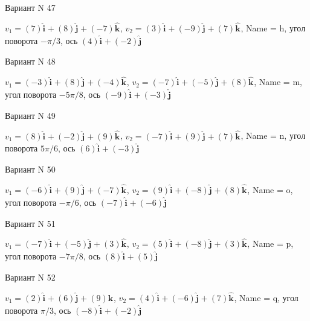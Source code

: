 \documentclass[11pt]{report}
\begin{document}
Вариант N 47

$v_1 = \left(7\right)\mathbf{\hat{i}_{}} + \left(8\right)\mathbf{\hat{j}_{}} + \left(-7\right)\mathbf{\hat{k}_{}}$, $v_2 = \left(3\right)\mathbf{\hat{i}_{}} + \left(-9\right)\mathbf{\hat{j}_{}} + \left(7\right)\mathbf{\hat{k}_{}}$, Name = h, угол поворота $- \pi / 3$, ось $\left(4\right)\mathbf{\hat{i}_{}} + \left(-2\right)\mathbf{\hat{j}_{}}$

Вариант N 48

$v_1 = \left(-3\right)\mathbf{\hat{i}_{}} + \left(8\right)\mathbf{\hat{j}_{}} + \left(-4\right)\mathbf{\hat{k}_{}}$, $v_2 = \left(-7\right)\mathbf{\hat{i}_{}} + \left(-5\right)\mathbf{\hat{j}_{}} + \left(8\right)\mathbf{\hat{k}_{}}$, Name = m, угол поворота $- 5 \pi / 8$, ось $\left(-9\right)\mathbf{\hat{i}_{}} + \left(-3\right)\mathbf{\hat{j}_{}}$

Вариант N 49

$v_1 = \left(8\right)\mathbf{\hat{i}_{}} + \left(-2\right)\mathbf{\hat{j}_{}} + \left(9\right)\mathbf{\hat{k}_{}}$, $v_2 = \left(-7\right)\mathbf{\hat{i}_{}} + \left(9\right)\mathbf{\hat{j}_{}} + \left(7\right)\mathbf{\hat{k}_{}}$, Name = n, угол поворота $5 \pi / 6$, ось $\left(6\right)\mathbf{\hat{i}_{}} + \left(-3\right)\mathbf{\hat{j}_{}}$

Вариант N 50

$v_1 = \left(-6\right)\mathbf{\hat{i}_{}} + \left(9\right)\mathbf{\hat{j}_{}} + \left(-7\right)\mathbf{\hat{k}_{}}$, $v_2 = \left(9\right)\mathbf{\hat{i}_{}} + \left(-8\right)\mathbf{\hat{j}_{}} + \left(8\right)\mathbf{\hat{k}_{}}$, Name = o, угол поворота $- \pi / 6$, ось $\left(-7\right)\mathbf{\hat{i}_{}} + \left(-6\right)\mathbf{\hat{j}_{}}$

Вариант N 51

$v_1 = \left(-7\right)\mathbf{\hat{i}_{}} + \left(-5\right)\mathbf{\hat{j}_{}} + \left(3\right)\mathbf{\hat{k}_{}}$, $v_2 = \left(5\right)\mathbf{\hat{i}_{}} + \left(-8\right)\mathbf{\hat{j}_{}} + \left(3\right)\mathbf{\hat{k}_{}}$, Name = p, угол поворота $- 7 \pi / 8$, ось $\left(8\right)\mathbf{\hat{i}_{}} + \left(5\right)\mathbf{\hat{j}_{}}$

Вариант N 52

$v_1 = \left(2\right)\mathbf{\hat{i}_{}} + \left(6\right)\mathbf{\hat{j}_{}} + \left(9\right)\mathbf{\hat{k}_{}}$, $v_2 = \left(4\right)\mathbf{\hat{i}_{}} + \left(-6\right)\mathbf{\hat{j}_{}} + \left(7\right)\mathbf{\hat{k}_{}}$, Name = q, угол поворота $\pi / 3$, ось $\left(-8\right)\mathbf{\hat{i}_{}} + \left(-2\right)\mathbf{\hat{j}_{}}$
\end{document}
